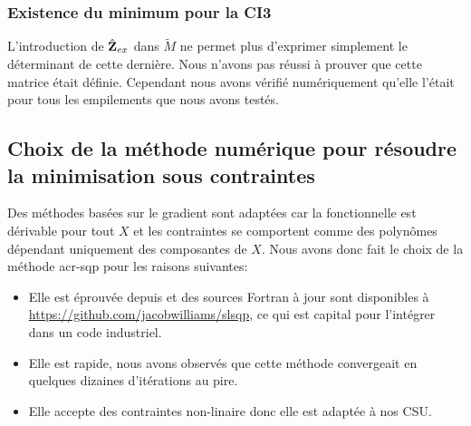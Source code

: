 \subsubsection{Existence du minimum pour la CI3}

  L'introduction de \(\hat{\mathbf{Z}}_{ex}\) dans \(\tilde M\) ne permet plus d'exprimer simplement le déterminant de cette dernière. Nous n'avons pas réussi à prouver que cette matrice était définie. Cependant nous avons vérifié numériquement qu'elle l'était pour tous les empilements que nous avons testés.


\subsection{Choix de la méthode numérique pour résoudre la minimisation sous contraintes}

  Des méthodes basées sur le gradient sont adaptées car la fonctionnelle est dérivable pour tout \(X\) et les contraintes se comportent comme des polynômes dépendant uniquement des composantes de \(X\). Nous avons donc fait le choix de la méthode \gls{acr-sqp} pour les raisons suivantes:
 
  \begin{itemize}
    \item Elle est éprouvée depuis \cite{kraft_software_1988} et des sources Fortran à jour sont disponibles à \url{https://github.com/jacobwilliams/slsqp}, ce qui est capital pour l'intégrer dans un code industriel.
    \item Elle est rapide, nous avons observés que cette méthode convergeait en quelques dizaines d'itérations au pire.
    \item Elle accepte des contraintes non-linaire donc elle est adaptée à nos CSU.
  \end{itemize}